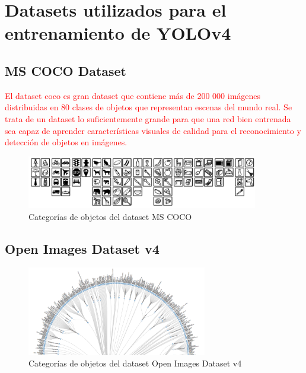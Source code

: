 \section{Datasets utilizados para el entrenamiento de YOLOv4}
\label{sec:datasets-utilizados}

\subsection{MS COCO Dataset}
\label{subsec:coco-dataset}

\textcolor{red}{El dataset \gls{coco} es gran dataset que contiene más de 200 000 imágenes distribuidas en 80 clases de objetos que representan escenas del mundo real. Se trata de un dataset lo suficientemente grande para que una red bien entrenada sea capaz de aprender características visuales de calidad para el reconocimiento y detección de objetos en imágenes.}

\begin{figure}[ht]
\centering
\includegraphics[width=0.9\textwidth]{img/chapters/resultados/datasets/cocodataset.png}
\caption{\label{fig:cocodataset}Categorías de objetos del dataset MS COCO}
\end{figure}

\newpage

\subsection{Open Images Dataset v4}
\label{subsec:OIDv4-dataset}

\begin{figure}[ht]
\centering
\includegraphics[width=0.7\textwidth]{img/chapters/resultados/datasets/oid-classes.png}
\caption{\label{fig:oiddataset}Categorías de objetos del dataset Open Images Dataset v4}
\end{figure}

